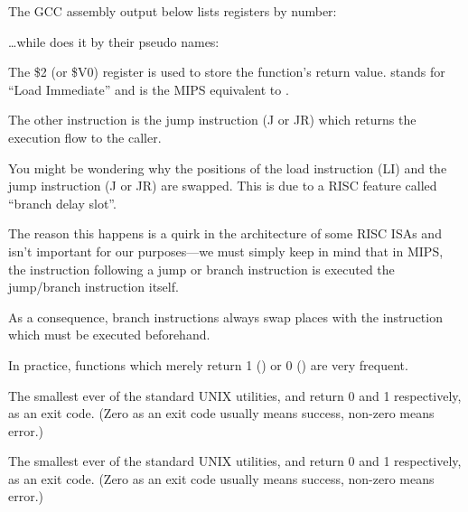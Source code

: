 The GCC assembly output below lists registers by number:



\dots while \IDA does it by their pseudo names:



The \$2 (or \$V0) register is used to store the function's return value.
 stands for ``Load Immediate'' and is the MIPS equivalent to \MOV.

The other instruction is the jump instruction (J or JR) which returns the execution flow to the \gls{caller}.

You might be wondering why the positions of the load instruction (LI) and the jump instruction (J or JR) are swapped. This is due to a \ac{RISC} feature called ``branch delay slot''.

The reason this happens is a quirk in the architecture of some RISC \ac{ISA}s and isn't important for our
purposes---we must simply keep in mind that in MIPS, the instruction following a jump or branch instruction
is executed  the jump/branch instruction itself.

As a consequence, branch instructions always swap places with the instruction which must be executed beforehand.


In practice, functions which merely return 1 () or 0 () are very frequent.

The smallest ever of the standard UNIX utilities,  and  return 0 and 1 respectively, as an exit code.
(Zero as an exit code usually means success, non-zero means error.)

The smallest ever of the standard UNIX utilities,  and  return 0 and 1 respectively, as an exit code.
(Zero as an exit code usually means success, non-zero means error.)
